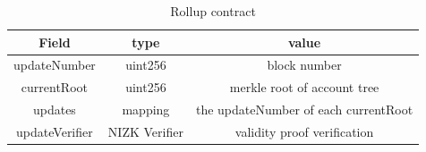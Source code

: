 \documentclass{article}
\begin{document}
\begin{table}[]
    \centering
    \begin{tabular}{c|c|c}
       Field  &  type & value \\
       \hline
        updateNumber & uint256 & block number \\
        currentRoot & uint256 & merkle root of account tree \\
        updates & mapping &  the updateNumber of each currentRoot \\
        updateVerifier & NIZK Verifier & validity proof verification
    \end{tabular}
    \caption{Rollup contract}
    \label{tab:block}
\end{table}


\begin{appendices}

\end{appendices}




\end{document}

